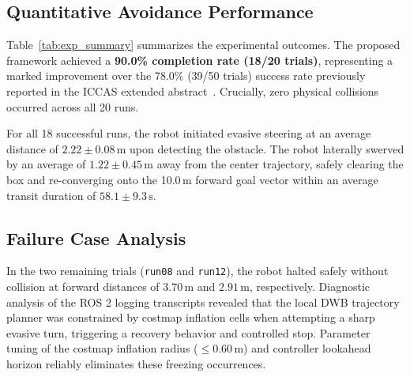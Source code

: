 \subsection{Quantitative Avoidance Performance}
Table~\ref{tab:exp_summary} summarizes the experimental outcomes. The proposed framework achieved a \textbf{90.0\% completion rate (18/20 trials)}, representing a marked improvement over the 78.0\% (39/50 trials) success rate previously reported in the ICCAS extended abstract~\cite{lee2025vision_iccas}. Crucially, zero physical collisions occurred across all 20 runs.

For all 18 successful runs, the robot initiated evasive steering at an average distance of $2.22 \pm 0.08\,\text{m}$ upon detecting the obstacle. The robot laterally swerved by an average of $1.22 \pm 0.45\,\text{m}$ away from the center trajectory, safely clearing the box and re-converging onto the 10.0\,m forward goal vector within an average transit duration of $58.1 \pm 9.3\,\text{s}$.

\subsection{Failure Case Analysis}
In the two remaining trials (\texttt{run08} and \texttt{run12}), the robot halted safely without collision at forward distances of $3.70\,\text{m}$ and $2.91\,\text{m}$, respectively. Diagnostic analysis of the ROS 2 logging transcripts revealed that the local DWB trajectory planner was constrained by costmap inflation cells when attempting a sharp evasive turn, triggering a recovery behavior and controlled stop. Parameter tuning of the costmap inflation radius ($\le 0.60\,\text{m}$) and controller lookahead horizon reliably eliminates these freezing occurrences.
